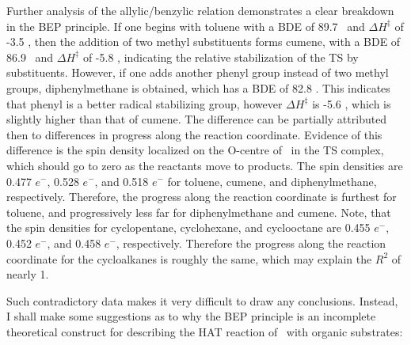 Further analysis of the allylic/benzylic relation demonstrates a clear breakdown
in the BEP principle. If one begins with toluene with a BDE of 89.7 \kcalmol\
and $\Delta H^\ddagger$ of -3.5 \kcalmol, then the addition of two methyl
substituents forms cumene, with a BDE of 86.9 \kcalmol\ and $\Delta H^\ddagger$
of -5.8 \kcalmol, indicating the relative stabilization of the TS by
substituents. However, if one adds another phenyl group instead of two methyl
groups, diphenylmethane is obtained, which has a BDE of 82.8 \kcalmol. This
indicates that phenyl is a better radical stabilizing group, however $\Delta
H^\ddagger$ is -5.6 \kcalmol, which is slightly higher than that of cumene. The
difference can be partially attributed then to differences in progress along the
reaction coordinate. Evidence of this difference is the spin density localized
on the O-centre of \cumo\ in the TS complex, which should go to zero as the
reactants move to products. The \ch{O^.} spin densities are 0.477 $e^-$, 0.528
$e^-$, and 0.518 $e^-$ for toluene, cumene, and diphenylmethane, respectively.
Therefore, the progress along the reaction coordinate is furthest for toluene,
and progressively less far for diphenylmethane and cumene. Note, that the
\ch{O^.} spin densities for cyclopentane, cyclohexane, and cyclooctane are 0.455
$e^-$, 0.452 $e^-$, and 0.458 $e^-$, respectively. Therefore the progress along
the reaction coordinate for the cycloalkanes is roughly the same, which may
explain the $R^2$ of nearly 1.

Such contradictory data makes it very difficult to draw any conclusions.
Instead, I shall make some suggestions as to why the BEP principle is an
incomplete theoretical construct for describing the HAT reaction of \cumo\ with
organic substrates:

